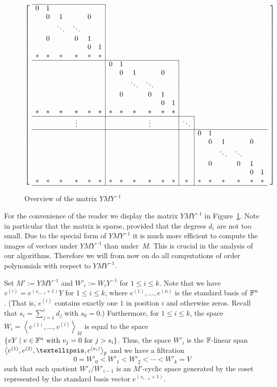 \begin{figure}
\caption{Overview of the matrix $YMY^{-1}$}
\label{bigmat}
\[ \left[ \ \begin{array}{cccccc|cccccc|c|cccccc}
\cline{1-6}
  0 & 1 &      &      &   &   \\
    & 0 & 1    &      & 0 &   \\
    &   &\ddots&\ddots&   &   \\
    & 0 &      &   0  & 1 &   \\
    &   &      &      & 0 & 1 \\
  {}* & * &   *  &   *  & * & * \\
\cline{1-12}
  &&&&&& 0 & 1 &      &      &   &   \\
  &&&&&&  & 0 & 1    &      & 0 &   \\
  &&&&&&  &   &\ddots&\ddots&   &   \\
  &&&&&&  & 0 &      &   0  & 1 &   \\
  &&&&&&  &   &      &      & 0 & 1 \\
  {}*&*&*&*&*&*&* & * &   *  &   *  & * & * \\
\cline{1-13}
  &&&\vdots&&& &&&\vdots&&& \ddots \\
\cline{1-19}
  &&&&&& &&&&&& & 0 & 1 &      &      &   &   \\
  &&&&&& &&&&&& & & 0 & 1    &      & 0 &   \\
  &&&&&& &&&&&& & &   &\ddots&\ddots&   &   \\
  &&&&&& &&&&&& & & 0 &      &   0  & 1 &   \\
  &&&&&& &&&&&& & &   &      &      & 0 & 1 \\
  {}*&*&*&*&*&*& *&*&*&*&*&*&* &*& * &   *  &   *  & * & * \\
\hline
\end{array} \ \right] \]
\end{figure}

For the convenience of the reader we display the matrix
$YMY^{-1}$ in Figure~\ref{bigmat}. Note in particular that the matrix is
sparse, provided that the degrees $d_i$ are not too small.
Due to the special form of $YMY^{-1}$ it is much more efficient to compute
the images of vectors under $YMY^{-1}$ than under~$M$. 
This is crucial in the analysis of our algorithms. 
Therefore we will from now on do all computations of order polynomials
with respect to $YMY^{-1}$.

Set $M' := YMY^{-1}$ and $W'_i := W_i Y^{-1}$ for $1 \le i \le k$.
Note that we have $v^{(i)} = e^{(s_{i-1}+1)} Y$ for $1 \le i \le k$,
where $e^{(1)}, \ldots, e^{(n)}$ is the standard basis of $\mathbb{F}^n$. (That is,  
 $e^{(i)}$ contains exactly one $1$ in position $i$ and otherwise zeros. Recall
that $s_i = \sum_{j=1}^i d_j$ with $s_0 = 0$.) Furthermore, for $1 \le i \le k$,
the space $W_i = \left< v^{(1)}, \ldots, v^{(i)} \right>_M$ is equal to the space
$\{ vY \mid v \in \mathbb{F}^n \mbox{ with } v_j = 0 \mbox{ for } j > s_i \}$. 
Thus, the space $W'_i$ is the $\mathbb{F}$-linear
span $\left< e^{(1)}, e^{(2)}, \ldots, e^{(s_i)}\right>_\F$ and we have a
filtration
\[ 0 = W'_0 < W'_1 < W'_2 < \cdots < W'_k = V \]
such that each quotient $W'_i/W'_{i-1}$ is an $M'$-cyclic space generated 
by the coset represented by the standard basis vector $e^{(s_{i-1}+1)}$.

